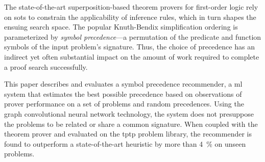 
The state-of-the-art superposition-based theorem provers for {first-or\-der} logic
rely on \glspl{sot} to constrain the applicability of inference rules,
which in turn shapes the ensuing search space.
The popular Knuth-Bendix simplification ordering is parameterized by 
\emph{symbol precedence}---a permutation of the predicate and function symbols
of the input problem's signature.
Thus, the choice of precedence has an indirect yet often substantial impact
on the amount of work required to complete a proof search successfully.

This paper describes and evaluates a symbol precedence recommender,
a \acrlong{ml} system that estimates the best possible precedence
based on observations of prover performance on a set of problems and random precedences.
Using the graph convolutional neural network technology,
the system does not presuppose the problems to be related or share a common signature. 
When coupled with the theorem prover \Vampire{} and evaluated on the \acrshort{tptp} problem library,
the recommender is found to outperform a state-of-the-art heuristic by more than \SI{4}{\percent}
on unseen problems.




